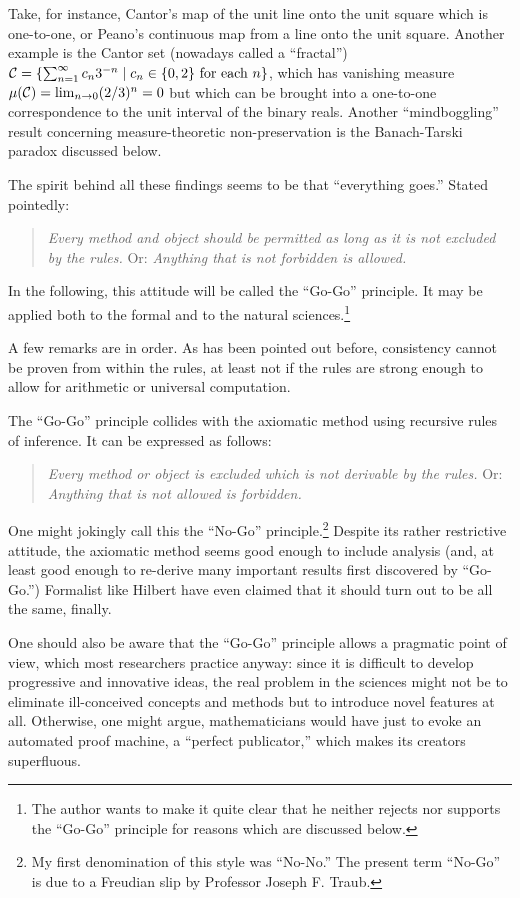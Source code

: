 Take, for instance, Cantor's map of the unit line onto the unit square
which is one-to-one, or Peano's continuous map from a line onto the unit
square. Another example is the Cantor set (nowadays called a
``fractal'')
${\cal C}= \{ \sum_{n=1}^\infty c_n3^{-n}\mid c_n\in \{0,2\} \mbox{ for
each }n\}$, which has vanishing measure $\mu ({\cal
C})=\lim_{n\rightarrow 0}(2/3)^n=0$ but which can be brought into a
one-to-one correspondence to the unit interval of the binary reals.
Another ``mindboggling'' result concerning measure-theoretic
non-preservation is the Banach-Tarski paradox discussed below.

The spirit behind all these findings seems to be
 that
``everything goes.'' Stated pointedly:
\begin{quote}
{\em Every method and object should be permitted as long
as it is not excluded by the rules.} Or:
{\em Anything that is not forbidden is allowed.}
\end{quote}
In the following, this attitude will be called the ``Go-Go'' principle.
It may be applied both to the formal and to the natural
sciences.\footnote{
The author wants to make it quite clear that he neither rejects nor
supports the ``Go-Go'' principle for reasons which are discussed below.}

A few remarks are in order.
As has been pointed out before, consistency cannot be
proven from within the rules, at least not if the rules are strong
enough to allow for arithmetic or universal computation.


The
``Go-Go''
principle  collides with the axiomatic method using recursive
rules of inference. It can be expressed as follows:
\begin{quote}
{\em Every method or
object is excluded which is not derivable by the rules.}
Or:
{\em Anything that is not allowed is forbidden.}
\end{quote}
One might jokingly call this
the ``No-Go'' principle.\footnote{
My first denomination of this style was ``No-No.'' The present term
``No-Go'' is due to a Freudian slip
by Professor Joseph F. Traub.}
 Despite its rather restrictive attitude,
the axiomatic method seems good enough to include analysis
\cite{bishop-bridges} (and, at least good enough to re-derive many
important results first discovered by
``Go-Go.'')
Formalist like Hilbert have even claimed that it should turn out to be
all the same, finally.


One should also be aware that the ``Go-Go'' principle allows a
pragmatic
point of view, which most researchers practice anyway: since it is
difficult to develop progressive and innovative ideas, the real problem
in the sciences
might not be to eliminate ill-conceived concepts and methods but to
introduce novel features at all.
Otherwise, one might argue,  mathematicians would have just to evoke
an automated proof machine, a
``perfect publicator,'' which makes its creators superfluous.

